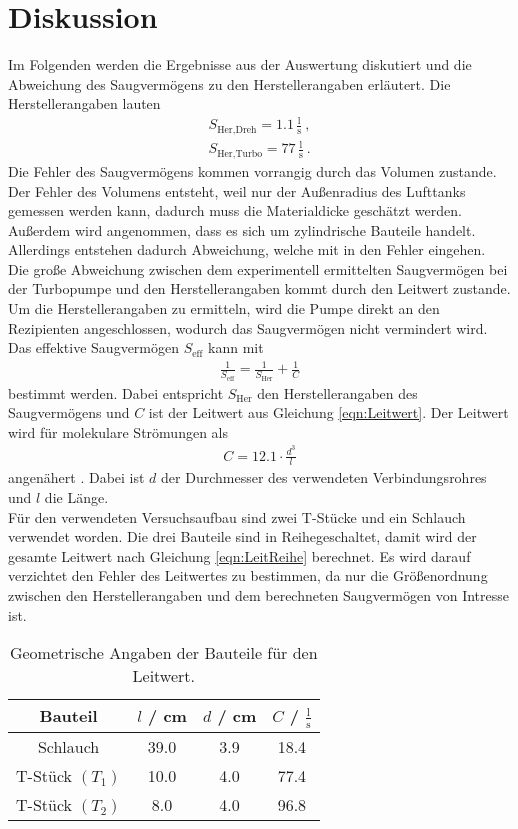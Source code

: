 \section{Diskussion}
\label{sec:Diskussion}
Im Folgenden werden die Ergebnisse aus der Auswertung diskutiert und die Abweichung des Saugvermögens zu den Herstellerangaben erläutert. Die Herstellerangaben lauten
\begin{align*}
  S_\text{Her,Dreh} = 1.1 \, \frac{\text{l}}{\text{s}} \ , \\
  S_\text{Her,Turbo} = 77 \, \frac{\text{l}}{\text{s}} \ .
\end{align*}
Die Fehler des Saugvermögens kommen vorrangig durch das Volumen zustande. Der Fehler des Volumens entsteht, weil nur der Außenradius des Lufttanks gemessen werden kann, dadurch muss die Materialdicke geschätzt werden. Außerdem wird angenommen, dass es sich um zylindrische Bauteile handelt. Allerdings entstehen dadurch Abweichung, welche mit in den Fehler eingehen. \\
Die große Abweichung zwischen dem experimentell ermittelten Saugvermögen bei der Turbopumpe und den Herstellerangaben kommt durch den Leitwert zustande. Um die Herstellerangaben zu ermitteln, wird die Pumpe direkt an den Rezipienten angeschlossen, wodurch das Saugvermögen nicht vermindert wird. Das effektive Saugvermögen $S_\text{eff}$ kann mit
\begin{align}
  \frac{1}{S_\text{eff}} = \frac{1}{S_\text{Her}} + \frac{1}{C}
\end{align}
bestimmt werden. Dabei entspricht $S_\text{Her}$ den Herstellerangaben des Saugvermögens und $C$ ist der Leitwert aus Gleichung \eqref{eqn:Leitwert}. Der Leitwert wird für molekulare Strömungen als
\begin{align}
  C = 12.1 \cdot \frac{d^3}{l}
\end{align}
angenähert \cite{Grundlagen}. Dabei ist $d$ der Durchmesser des verwendeten Verbindungsrohres und $l$ die Länge. \\
Für den verwendeten Versuchsaufbau sind zwei T-Stücke und ein Schlauch verwendet worden. Die drei Bauteile sind in Reihegeschaltet, damit wird der gesamte Leitwert nach Gleichung \eqref{eqn:LeitReihe} berechnet. Es wird darauf verzichtet den Fehler des Leitwertes zu bestimmen, da nur die Größenordnung zwischen den Herstellerangaben und dem berechneten Saugvermögen von Intresse ist.

\begin{table}[H]
   \centering
   \caption{Geometrische Angaben der Bauteile für den Leitwert.}
   \label{tab:angabenLeitwert}
   \begin{tabular}{c|c|c|c}
     Bauteil & $l$ / cm & $d$ / cm & $C$ / $\frac{\text{l}}{\text{s}}$ \\
     \midrule
     Schlauch        & 39.0 & 3.9 & 18.4 \\
     T-Stück $(T_1)$ & 10.0 & 4.0 & 77.4 \\
     T-Stück $(T_2)$ & 8.0  & 4.0 & 96.8 \\
   \end{tabular}
 \end{table}

